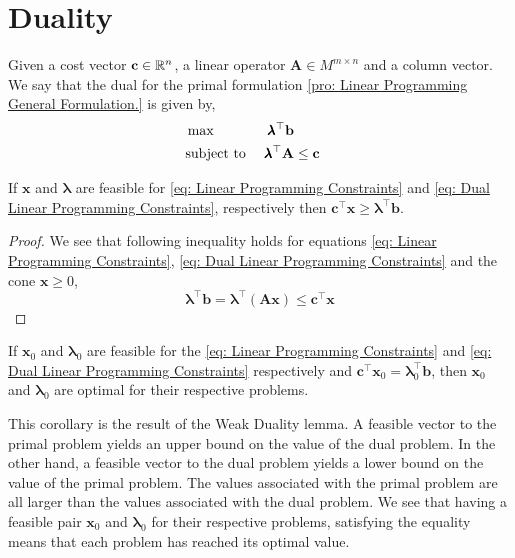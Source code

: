 \section{Duality}
\begin{problem}
	\label{pro: Linear Programming Dual Formulation.}
	Given a cost vector $\mathbf{c}\in \mathbb{R}^n$, a linear operator $\mathbf{A}\in M^{m\times n}$ and a column vector. We say that the dual for the primal formulation \ref{pro: Linear Programming General Formulation.} is given by,	
	\begin{align}
		&\max & \pmb{\lambda}^\top\mathbf{b} \label{eq: Dual Linear Programming Max}&\\
		&\text{subject to }& \pmb{\lambda}^\top\mathbf{A}&\leq \mathbf{c} & \label{eq: Dual Linear Programming Constraints} 
	\end{align}
\end{problem}

\begin{lemma}
If $\mathbf{x}$ and $\pmb{\lambda}$ are feasible for \eqref{eq: Linear Programming Constraints} and \eqref{eq: Dual Linear Programming Constraints}, respectively then $\mathbf{c}^\top\mathbf{x}\geq \pmb{\lambda}^\top\mathbf{b}$.
\end{lemma}

\begin{proof}
	We see that following inequality holds for equations \eqref{eq: Linear Programming Constraints}, \eqref{eq: Dual Linear Programming Constraints} and the cone $\mathbf{x}\geq 0$,
	\begin{equation*}
			\pmb{\lambda}^\top \mathbf{b}=\pmb{\lambda}^\top\left(\mathbf{Ax}\right)\leq \mathbf{c}^\top\mathbf{x}
	\end{equation*}
\end{proof}

\begin{corollary}
	\label{cor: Dual Primal equality}
	If $\mathbf{x}_0$ and $\pmb{\lambda}_0$ are feasible for the \eqref{eq: Linear Programming Constraints} and \eqref{eq: Dual Linear Programming Constraints} respectively and  $\mathbf{c}^\top \mathbf{x}_0=\pmb{\lambda}_0^\top\mathbf{b}$, then $\mathbf{x}_0$ and $\pmb{\lambda}_0$ are optimal for their respective problems.
\end{corollary}

This corollary is the result of the Weak Duality lemma. A feasible vector to the primal problem yields an upper bound on the value of the dual problem. In the other hand, a feasible vector to the dual problem yields a lower bound on the value of the primal problem. The values associated with the primal problem are all larger than the values associated with the dual problem. We see that having a feasible pair $\mathbf{x}_0$ and $\pmb{\lambda}_0$ for their respective problems, satisfying the equality means that each problem has reached its optimal value. 

